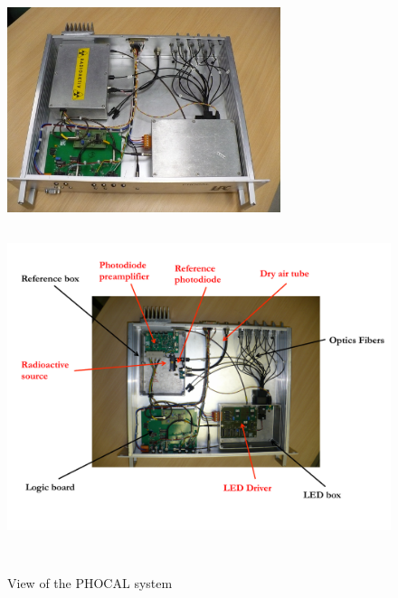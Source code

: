 \begin{figure}[htbp]
\centering
\includegraphics[height=6cm]{figures/phocal1.JPG}
\includegraphics[height=10cm]{figures/phocal2_comm.pdf}
\caption{View of the PHOCAL system}\label{fig:lasphocal}
\end{figure}